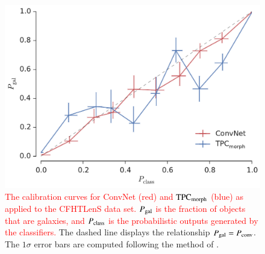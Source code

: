 \documentclass[fleqn,usenatbib]{mnras}
\newcommand{\changed}[1]{\textcolor{red}{#1}}
\begin{document}
\begin{figure}
  \centering
  \includegraphics[width=\columnwidth]{figures/clens_calibration.pdf}
  \caption{
    \changed{
    The calibration curves for ConvNet (red) and ${\mathrm{TPC}}_{{\mathrm{morph}}}$ (blue)
    as applied to the CFHTLenS data set.
    $P_{{\mathrm{gal}}}$ is the fraction of objects that are galaxies, and
    $P_{{\mathrm{class}}}$ is the probabilistic outputs generated by the classifiers.
    }
    The dashed line displays the relationship
    $P_{{\mathrm{gal}}} = P_{{\mathrm{conv}}}$.
    The $1 \sigma$ error bars are computed following the method
    of \citet{paterno2004calculating}.
    }
  \label{fig:clens_calibration}
\end{figure}
\end{document}
